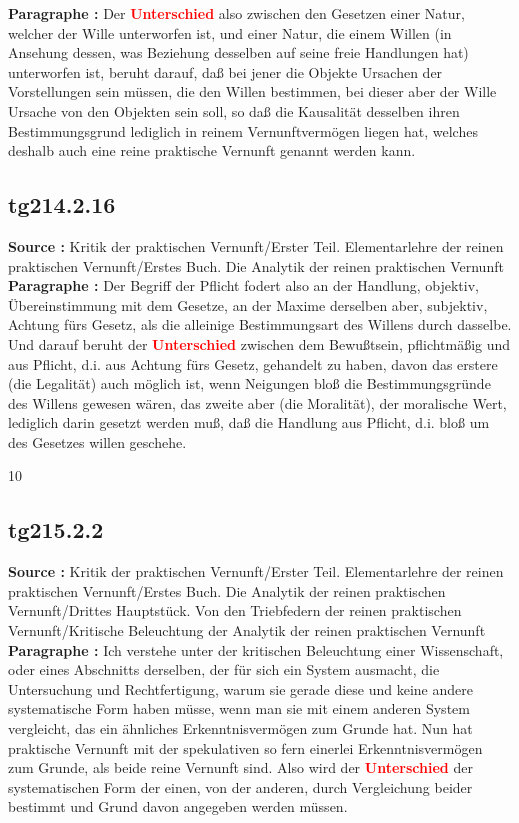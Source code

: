 \documentclass[a4paper,12pt,twoside]{book}
\newcommand{\match}[1]{\textcolor{red}{\textbf{#1}}}
\begin{document}
	\noindent\textbf{Paragraphe : }Der \match{Unterschied} also zwischen den Gesetzen einer Natur, welcher der Wille unterworfen ist, und einer Natur, die einem Willen (in Ansehung dessen, was Beziehung desselben auf seine freie Handlungen hat) unterworfen ist, beruht darauf, daß bei jener die Objekte Ursachen der Vorstellungen sein müssen, die den Willen bestimmen, bei dieser aber der Wille Ursache von den Objekten sein soll, so daß die Kausalität desselben ihren Bestimmungsgrund lediglich in reinem Vernunftvermögen liegen hat, welches deshalb auch eine reine praktische Vernunft genannt werden kann. 
	
	\subsection*{tg214.2.16} 
	\textbf{Source : }Kritik der praktischen Vernunft/Erster Teil. Elementarlehre der reinen praktischen Vernunft/Erstes Buch. Die Analytik der reinen praktischen Vernunft\\  
	
	\noindent\textbf{Paragraphe : }
	Der Begriff der Pflicht fodert also an der Handlung, objektiv, Übereinstimmung mit dem Gesetze, an der Maxime derselben aber, subjektiv, Achtung fürs Gesetz, als die alleinige Bestimmungsart des Willens durch dasselbe. Und darauf beruht der \match{Unterschied} zwischen dem Bewußtsein, pflichtmäßig und aus Pflicht, d.i. aus Achtung fürs Gesetz, gehandelt zu haben, davon das erstere (die Legalität) auch möglich ist, wenn Neigungen bloß die Bestimmungsgründe des Willens gewesen wären, das zweite aber (die Moralität), der moralische Wert, lediglich darin gesetzt werden muß, daß die Handlung aus Pflicht, d.i. bloß um des Gesetzes willen geschehe.
	
	
	10
	
	
	
	\subsection*{tg215.2.2} 
	\textbf{Source : }Kritik der praktischen Vernunft/Erster Teil. Elementarlehre der reinen praktischen Vernunft/Erstes Buch. Die Analytik der reinen praktischen Vernunft/Drittes Hauptstück. Von den Triebfedern der reinen praktischen Vernunft/Kritische Beleuchtung der Analytik der reinen praktischen Vernunft\\  
	
	\noindent\textbf{Paragraphe : }Ich verstehe unter der kritischen Beleuchtung einer Wissenschaft, oder eines Abschnitts derselben, der für sich ein System ausmacht, die Untersuchung und Rechtfertigung, warum sie gerade diese und keine andere systematische Form haben müsse, wenn man sie mit einem anderen System vergleicht, das ein ähnliches Erkenntnisvermögen zum Grunde hat. Nun hat praktische Vernunft mit der spekulativen  so fern einerlei Erkenntnisvermögen zum Grunde, als beide reine Vernunft sind. Also wird der \match{Unterschied} der systematischen Form der einen, von der anderen, durch Vergleichung beider bestimmt und Grund davon angegeben werden müssen. 
	
\end{document}
